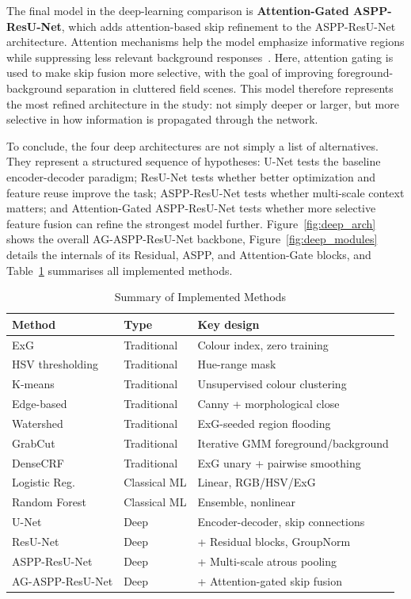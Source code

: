 \documentclass[conference]{IEEEtran}
\begin{document}
The final model in the deep-learning comparison is \textbf{Attention-Gated
ASPP-ResU-Net}, which adds attention-based skip refinement to the
ASPP-ResU-Net architecture. Attention mechanisms help the model
emphasize informative regions while suppressing less relevant background
responses~\cite{oktay2018}. Here, attention gating is used to make skip
fusion more selective, with the goal of improving foreground-background
separation in cluttered field scenes. This model therefore represents
the most refined architecture in the study: not simply deeper or larger,
but more selective in how information is propagated through the network.

To conclude, the four deep architectures are not simply a list of
alternatives. They represent a structured sequence of hypotheses: U-Net
tests the baseline encoder-decoder paradigm; ResU-Net tests whether
better optimization and feature reuse improve the task; ASPP-ResU-Net
tests whether multi-scale context matters; and Attention-Gated
ASPP-ResU-Net tests whether more selective feature fusion can refine the
strongest model further. Figure~\ref{fig:deep_arch} shows the overall
AG-ASPP-ResU-Net backbone, Figure~\ref{fig:deep_modules} details the
internals of its Residual, ASPP, and Attention-Gate blocks, and
Table~\ref{tab:methods} summarises all implemented methods.

\begin{table}[t]
\centering
\caption{Summary of Implemented Methods}\label{tab:methods}
\renewcommand{\arraystretch}{1.1}
\begin{tabular}{@{}ll>{\raggedright\arraybackslash}p{2.8cm}@{}}
\toprule
\textbf{Method} & \textbf{Type} & \textbf{Key design} \\
\midrule
ExG               & Traditional & Colour index, zero training \\
HSV thresholding  & Traditional & Hue-range mask \\
K-means           & Traditional & Unsupervised colour clustering \\
Edge-based        & Traditional & Canny + morphological close \\
Watershed         & Traditional & ExG-seeded region flooding \\
GrabCut           & Traditional & Iterative GMM foreground/background \\
DenseCRF          & Traditional & ExG unary + pairwise smoothing \\
\midrule
Logistic Reg.     & Classical ML & Linear, RGB/HSV/ExG \\
Random Forest     & Classical ML & Ensemble, nonlinear \\
\midrule
U-Net             & Deep & Encoder-decoder, skip connections \\
ResU-Net          & Deep & + Residual blocks, GroupNorm \\
ASPP-ResU-Net     & Deep & + Multi-scale atrous pooling \\
AG-ASPP-ResU-Net  & Deep & + Attention-gated skip fusion \\
\bottomrule
\end{tabular}
\end{table}
\end{document}
